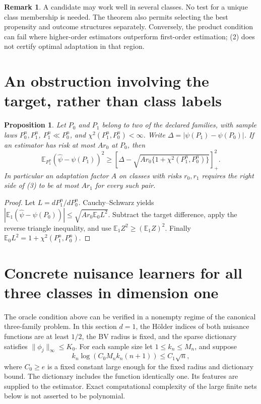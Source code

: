 \documentclass[11pt]{article}
\newtheorem{proposition}[theorem]{Proposition}
\theoremstyle{definition}
\newtheorem{remark}[theorem]{Remark}
\begin{document}
\begin{remark}
A candidate may work well in several classes. No test for a unique class
membership is needed. The theorem also permits selecting the best propensity
and outcome structures separately. Conversely, the product condition can
fail where higher-order estimators outperform first-order estimation;
(2) does not certify optimal adaptation in that region.
\end{remark}

\section*{An obstruction involving the target, rather than class labels}
\begin{proposition}
Let $P_0$ and $P_1$ belong to two of the declared families, with sample laws
$P_0^n,P_1^n$, $P_1^n\ll P_0^n$, and
$\chi^2(P_1^n,P_0^n)<\infty$. Write $\Delta=|\psi(P_1)-\psi(P_0)|$.
If an estimator has risk at most $A r_0$ at $P_0$, then
\[
 \mathbb E_{P_1^n}(\widehat\psi-\psi(P_1))^2
 \ge\left[\Delta-\sqrt{A r_0\{1+\chi^2(P_1^n,P_0^n)\}}\right]_+^2. \tag{3}
\]
In particular an adaptation factor $A$ on classes with risks $r_0,r_1$
requires the right side of (3) to be at most $A r_1$ for every such pair.
\end{proposition}
\begin{proof}
Let $L=dP_1^n/dP_0^n$. Cauchy--Schwarz yields
$|\mathbb E_1(\widehat\psi-\psi(P_0))|
\le\sqrt{A r_0\mathbb E_0L^2}$. Subtract the target difference,
apply the reverse triangle inequality, and use
$\mathbb E_1 Z^2\ge(\mathbb E_1Z)^2$. Finally
$\mathbb E_0L^2=1+\chi^2(P_1^n,P_0^n)$.
\end{proof}

\section*{Concrete nuisance learners for all three classes in dimension one}
The oracle condition above can be verified in a nonempty regime of the
canonical three-family problem. In this section $d=1$, the H\"older
indices of both nuisance functions are at least $1/2$, the BV radius is
fixed, and the sparse dictionary satisfies $\|\phi_j\|_\infty\le K_0$.
For each sample size let $1\le k_n\le M_n$, and suppose
\[
 k_n\log(C_0 M_n k_n(n+1))\le C_1\sqrt n,             \tag{4}
\]
where $C_0\ge e$ is a fixed constant large enough for the fixed radius
and dictionary bound. The dictionary includes the function identically
one. Its features are supplied to the estimator. Exact computational
complexity of the large finite nets below is not asserted to be polynomial.
\end{document}
